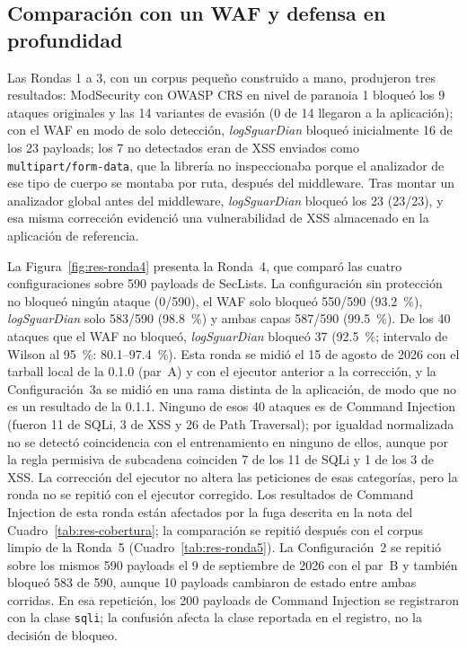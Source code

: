 \subsection{Comparación con un WAF y defensa en profundidad}

Las Rondas 1 a 3, con un corpus pequeño construido a mano, produjeron tres resultados: ModSecurity
con OWASP CRS en nivel de paranoia 1 bloqueó los 9 ataques originales y las 14 variantes de evasión
(0 de 14 llegaron a la aplicación); con el WAF en modo de solo detección, \textit{logSguarDian} bloqueó inicialmente 16 de los 23
payloads; los 7 no detectados eran de XSS enviados como \texttt{multipart/form-data}, que la
librería no inspeccionaba porque el analizador de ese tipo de cuerpo se montaba por ruta, después
del middleware. Tras montar un analizador global antes del middleware, \textit{logSguarDian}
bloqueó los 23 (23/23), y esa misma corrección evidenció una vulnerabilidad de XSS almacenado en la
aplicación de referencia.

La Figura~\ref{fig:res-ronda4} presenta la Ronda~4, que comparó las cuatro configuraciones sobre
590 payloads de SecLists. La configuración sin protección no bloqueó ningún ataque (0/590), el WAF
solo bloqueó 550/590 (93.2~\%), \textit{logSguarDian} solo 583/590 (98.8~\%) y ambas capas 587/590
(99.5~\%). De los 40 ataques que el WAF no bloqueó, \textit{logSguarDian} bloqueó 37 (92.5~\%;
intervalo de Wilson al 95~\%: 80.1--97.4~\%). Esta ronda se midió el 15 de agosto de 2026 con el
tarball local de la 0.1.0 (par~A) y con el ejecutor anterior a la corrección, y la Configuración~3a se midió
en una rama distinta de la aplicación, de modo que no es un resultado de la 0.1.1. Ninguno de esos 40 ataques es de Command Injection (fueron 11 de SQLi, 3 de
XSS y 26 de Path Traversal); por igualdad normalizada no se detectó coincidencia con el
entrenamiento en ninguno de ellos, aunque por la regla permisiva de subcadena coinciden 7 de los 11
de SQLi y 1 de los 3 de XSS. La corrección del ejecutor no altera las peticiones de esas
categorías, pero la ronda no se repitió con el ejecutor corregido. Los resultados
de Command Injection de esta ronda están afectados por la fuga descrita en la nota del
Cuadro~\ref{tab:res-cobertura}; la comparación se repitió después con el corpus limpio de la Ronda~5 (Cuadro~\ref{tab:res-ronda5}). La
Configuración~2 se repitió sobre los mismos 590 payloads el 9 de septiembre de 2026 con el par~B y
también bloqueó 583 de 590, aunque 10 payloads cambiaron de estado entre ambas corridas. En esa
repetición, los 200 payloads de Command Injection se registraron con la clase \texttt{sqli}; la
confusión afecta la clase reportada en el registro, no la decisión de bloqueo.

